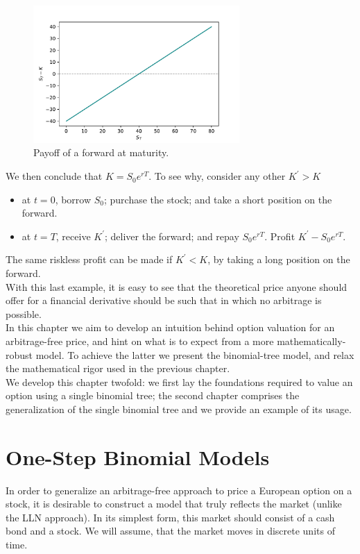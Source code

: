 \documentclass[../TGMAFFIRO.tex]{subfiles}
\begin{document}
\begin{figure}[hbt]
	\centering
  \includegraphics[width=0.7\textwidth]{../images/foward_payoff}
  \caption{Payoff of a forward at maturity.}
\end{figure}

We then conclude that $K=S_0e^{rT}$. To see why, consider any other $K^\prime > K$
\begin{itemize}
	\item at $t=0$, borrow $S_0$; purchase the stock; and take a short position on the forward.
	\item at $t=T$, receive $K^\prime$; deliver the forward; and repay $S_0e^{rT}$. Profit $K^\prime - S_0 e^{rT}$.
\end{itemize}

The same riskless profit can be made if $K^\prime < K$, by taking a long position on the forward.\\


With this last example, it is easy to see that the theoretical price anyone should offer for a financial derivative should be such that in which no arbitrage is possible.\\

 In this chapter we aim to develop an intuition behind option valuation for an arbitrage-free price, and hint on what is to expect from a more mathematically-robust model. To achieve the latter we present the binomial-tree model, and relax the mathematical rigor used in the previous chapter.\\

We develop this chapter twofold: we first lay the foundations required to value an option using a single binomial tree; the second chapter comprises the generalization of the single binomial tree and we provide an example of its usage.

\section{One-Step Binomial Models}\label{sect:one-step-binomial-model}
In order to generalize an arbitrage-free approach to price a European option on a stock, it is desirable to construct a model that truly reflects the market (unlike the LLN approach). In its simplest form, this market should consist of a cash bond and a stock. We will assume, that the market moves in discrete units of time.\\
\end{document}
